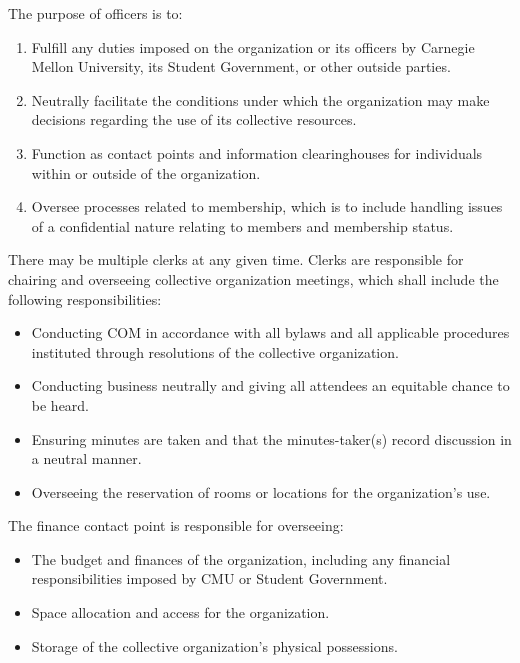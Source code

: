\documentclass[11pt]{article}
\newcounter{h1}
\newcounter{h2}[h1]
\newcounter{h3}[h2]
\begin{document}

The purpose of officers is to:

\begin{enumerate}
  \item Fulfill any duties imposed on the organization or its officers by Carnegie Mellon University, its Student Government, or other outside parties.
  \item Neutrally facilitate the conditions under which the organization may make decisions regarding the use of its collective resources.
  \item Function as contact points and information clearinghouses for individuals within or outside of the organization.
  \item Oversee processes related to membership, which is to include handling issues of a confidential nature relating to members and membership status.
\end{enumerate}



There may be multiple clerks at any given time. Clerks are responsible for chairing and overseeing collective organization meetings, which shall include the following responsibilities:

\begin{itemize}
  \item Conducting COM in accordance with all bylaws and all applicable procedures instituted through resolutions of the collective organization.
  \item Conducting business neutrally and giving all attendees an equitable chance to be heard.
  \item Ensuring minutes are taken and that the minutes-taker(s) record discussion in a neutral manner.
  \item Overseeing the reservation of rooms or locations for the organization's use.
\end{itemize}


The finance contact point is responsible for overseeing:

\begin{itemize}
  \item The budget and finances of the organization, including any financial responsibilities imposed by CMU or Student Government.
  \item Space allocation and access for the organization.
  \item Storage of the collective organization's physical possessions.
\end{itemize}
\end{document}
